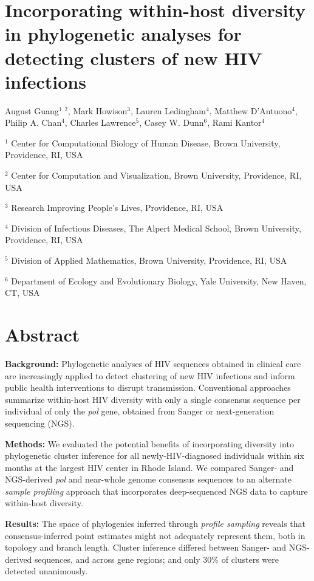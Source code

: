 \documentclass[letterpaper]{article}
\begin{document}
\section*{Incorporating within-host diversity in phylogenetic analyses for detecting clusters of new HIV infections}

August Guang$^{1,2}$, Mark Howison$^3$, Lauren Ledingham$^4$, Matthew D'Antuono$^4$, Philip A. Chan$^4$, Charles Lawrence$^5$, Casey W. Dunn$^6$, Rami Kantor$^4$

$^1$ Center for Computational Biology of Human Disease, Brown University, Providence, RI, USA

$^2$ Center for Computation and Visualization, Brown University, Providence, RI, USA

$^3$ Research Improving People's Lives, Providence, RI, USA

$^4$ Division of Infectious Diseases, The Alpert Medical School, Brown University, Providence, RI, USA

$^5$ Division of Applied Mathematics, Brown University, Providence, RI, USA

$^6$ Department of Ecology and Evolutionary Biology, Yale University, New Haven, CT, USA


\doublespace
\section*{Abstract}

\textbf{Background:} Phylogenetic analyses of HIV sequences obtained in clinical care are increasingly applied to detect clustering of new HIV infections and inform public health interventions to disrupt transmission. Conventional approaches summarize within-host HIV diversity with only a single consensus sequence per individual of only the \emph{pol} gene, obtained from Sanger or next-generation sequencing (NGS).

\textbf{Methods:} We evaluated the potential benefits of incorporating diversity into phylogenetic cluster inference for all newly-HIV-diagnosed individuals within six months at the largest HIV center in Rhode Island. We compared Sanger- and NGS-derived \emph{pol} and near-whole genome consensus sequences to an alternate \emph{sample profiling} approach that incorporates deep-sequenced NGS data to capture within-host diversity.

\textbf{Results:} The space of phylogenies inferred through \emph{profile sampling} reveals that consensus-inferred point estimates might not adequately represent them, both in topology and branch length. Cluster inference differed between Sanger- and NGS-derived sequences, and across gene regions; and only 30\% of clusters were detected unanimously.
\end{document}
